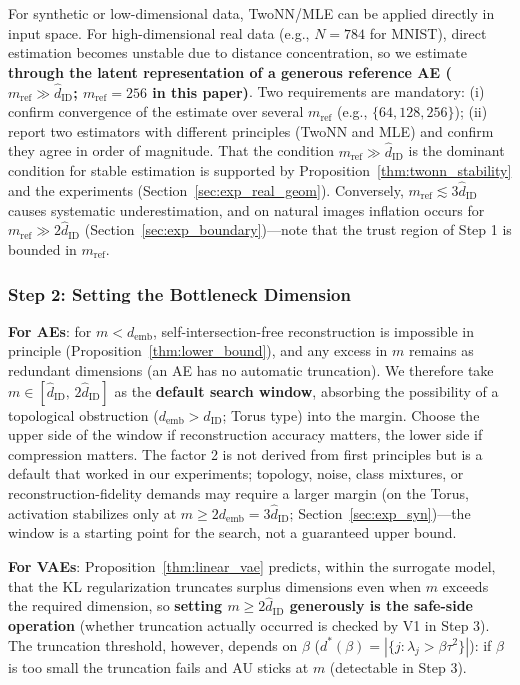 \documentclass[make,article,submit,pdftex,moreauthors]{Definitions/mdpi}
\newcommand{\dID}{d_{\mathrm{ID}}}
\newcommand{\hatdID}{\hat{d}_{\mathrm{ID}}}
\newcommand{\demb}{d_{\mathrm{emb}}}
\newcommand{\dstar}{d^{*}(\beta)}
\begin{document}
For synthetic or low-dimensional data, TwoNN/MLE can be applied directly in
input space.
For high-dimensional real data (e.g., $N = 784$ for MNIST), direct
estimation becomes unstable due to distance concentration, so we estimate
\textbf{through the latent representation of a generous reference AE
($m_{\mathrm{ref}} \gg \hatdID$; $m_{\mathrm{ref}} = 256$ in this paper)}.
Two requirements are mandatory:
(i) confirm convergence of the estimate over several $m_{\mathrm{ref}}$
(e.g., $\{64, 128, 256\}$);
(ii) report two estimators with different principles (TwoNN and MLE) and
confirm they agree in order of magnitude.
That the condition $m_{\mathrm{ref}} \gg \hatdID$ is the dominant condition
for stable estimation is supported by
Proposition~\ref{thm:twonn_stability} and the experiments
(Section~\ref{sec:exp_real_geom}).
Conversely, $m_{\mathrm{ref}} \lesssim 3\hatdID$ causes systematic
underestimation, and on natural images inflation occurs for
$m_{\mathrm{ref}} \gg 2\hatdID$ (Section~\ref{sec:exp_boundary})---note that
the trust region of Step 1 is bounded in $m_{\mathrm{ref}}$.

\subsubsection{Step 2: Setting the Bottleneck Dimension}\label{sec:protocol_s2}

\textbf{For AEs}: for $m < \demb$, self-intersection-free reconstruction is
impossible in principle (Proposition~\ref{thm:lower_bound}), and any excess
in $m$ remains as redundant dimensions (an AE has no automatic truncation).
We therefore take $m \in [\hatdID,\, 2\hatdID]$ as the \textbf{default
search window}, absorbing the possibility of a topological obstruction
($\demb > \dID$; Torus type) into the margin.
Choose the upper side of the window if reconstruction accuracy matters, the
lower side if compression matters.
The factor 2 is not derived from first principles but is a default that
worked in our experiments; topology, noise, class mixtures, or
reconstruction-fidelity demands may require a larger margin (on the Torus,
activation stabilizes only at $m \geq 2\demb = 3\hatdID$;
Section~\ref{sec:exp_syn})---the window is a starting point for the search,
not a guaranteed upper bound.

\textbf{For VAEs}: Proposition~\ref{thm:linear_vae} predicts, within the
surrogate model, that the KL regularization truncates surplus dimensions
even when $m$ exceeds the required dimension, so
\textbf{setting $m \geq 2\hatdID$ generously is the safe-side operation}
(whether truncation actually occurred is checked by V1 in Step 3).
The truncation threshold, however, depends on $\beta$
($\dstar = |\{j : \lambda_j > \beta\tau^2\}|$): if $\beta$ is too small the
truncation fails and AU sticks at $m$ (detectable in Step 3).
\end{document}
